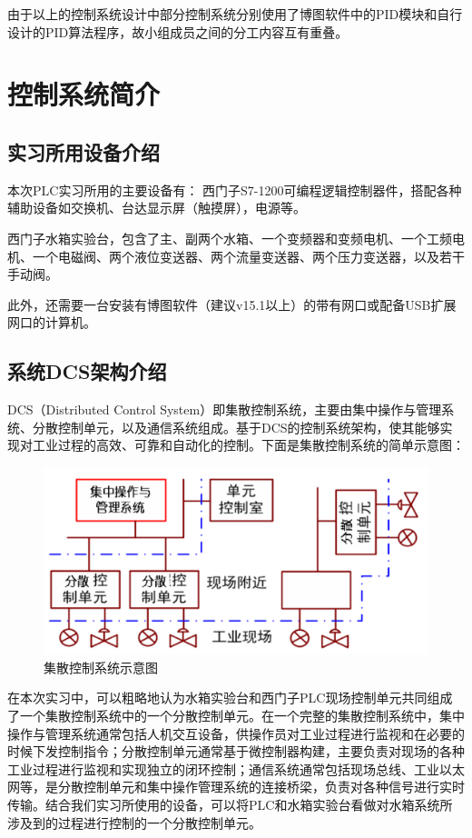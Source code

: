 \documentclass[UTF8]{article}
\begin{document}
由于以上的控制系统设计中部分控制系统分别使用了博图软件中的PID模块和自行设计的PID算法程序，故小组成员之间的分工内容互有重叠。

%
\section{控制系统简介}

\subsection{实习所用设备介绍}

本次PLC实习所用的主要设备有：
西门子S7-1200可编程逻辑控制器件，搭配各种辅助设备如交换机、台达显示屏（触摸屏），电源等。

西门子水箱实验台，包含了主、副两个水箱、一个变频器和变频电机、一个工频电机、一个电磁阀、两个液位变送器、两个流量变送器、两个压力变送器，以及若干手动阀。

此外，还需要一台安装有博图软件（建议v15.1以上）的带有网口或配备USB扩展网口的计算机。

\subsection{系统DCS架构介绍}
DCS（Distributed Control System）即集散控制系统，主要由集中操作与管理系统、分散控制单元，以及通信系统组成。基于DCS的控制系统架构，使其能够实现对工业过程的高效、可靠和自动化的控制。下面是集散控制系统的简单示意图：
\begin{figure}[H]
    \centering %
    \includegraphics[width=.6\textwidth]{figure/DCS示意图.png} 
    \caption{集散控制系统示意图} %
\end{figure}

在本次实习中，可以粗略地认为水箱实验台和西门子PLC现场控制单元共同组成了一个集散控制系统中的一个分散控制单元。在一个完整的集散控制系统中，集中操作与管理系统通常包括人机交互设备，供操作员对工业过程进行监视和在必要的时候下发控制指令；分散控制单元通常基于微控制器构建，主要负责对现场的各种工业过程进行监视和实现独立的闭环控制；通信系统通常包括现场总线、工业以太网等，是分散控制单元和集中操作管理系统的连接桥梁，负责对各种信号进行实时传输。结合我们实习所使用的设备，可以将PLC和水箱实验台看做对水箱系统所涉及到的过程进行控制的一个分散控制单元。
\end{document}
